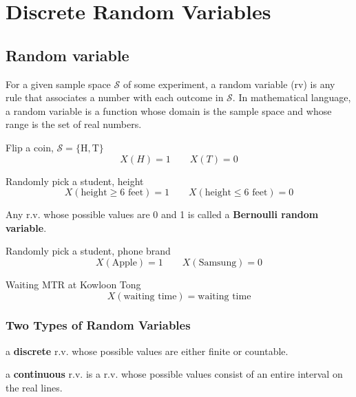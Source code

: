 \chapter{Discrete Random Variables}
\section{Random variable}

\begin{defn}
  For a given sample space $\mathcal{S}$ of some experiment, a random variable (rv) is any rule that associates a number with each outcome in $\mathcal{S}$. In mathematical language, a random variable is a function whose domain is the sample space
and whose range is the set of real numbers.
\end{defn}

\begin{exmp}
Flip a coin, $\mathcal{S}=\{\text{H} ,\text{T} \}$
\[X(H) = 1 \qquad X(T) =0 \]
\end{exmp}

\begin{exmp}
Randomly pick a student, height
\[X(\text{height}\geq \text{6 feet})=1  \qquad X(\text{height}\leq \text{6 feet})=0
\]
\end{exmp}

\begin{defn}
Any r.v. whose possible values are 0 and 1 is called a \textbf{Bernoulli random variable}.
\end{defn}

\begin{exmp}
Randomly pick a student, phone brand
\[X(\text{Apple})=1 \qquad  X(\text{Samsung})=0	\]
\end{exmp}

\begin{exmp}
Waiting MTR at Kowloon Tong
\[X(\text{waiting time})=\text{waiting time}\]
\end{exmp}

\subsection{Two Types of Random Variables}
\begin{defn}
a \textbf{discrete} r.v. whose possible values are either finite or countable.

a \textbf{continuous} r.v. is a r.v. whose possible values consist of an entire interval on the real lines.
\end{defn}

